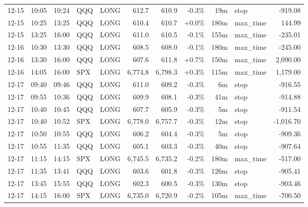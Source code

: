 \documentclass[11pt,a4paper,twoside]{article}
\begin{document}
\begin{center}
\begin{longtable}{>{\color{txtmain}}l l l l l r r r r >{\color{txtmain}}l r}
12-15 & 10:05 & 10:24 & QQQ & LONG & 612.7 & 610.9 & \textcolor{lossred}{-0.3\%} & 19m & stop & \textcolor{lossred}{-919.08} \\
12-15 & 10:25 & 13:25 & QQQ & LONG & 610.4 & 610.7 & \textcolor{wingreen}{+0.0\%} & 180m & max\_time & \textcolor{wingreen}{144.99} \\
12-15 & 13:25 & 16:00 & QQQ & LONG & 611.0 & 610.5 & \textcolor{lossred}{-0.1\%} & 155m & max\_time & \textcolor{lossred}{-235.01} \\
12-16 & 10:30 & 13:30 & QQQ & LONG & 608.5 & 608.0 & \textcolor{lossred}{-0.1\%} & 180m & max\_time & \textcolor{lossred}{-245.00} \\
12-16 & 13:30 & 16:00 & QQQ & LONG & 607.6 & 611.8 & \textcolor{wingreen}{+0.7\%} & 150m & max\_time & \textcolor{wingreen}{2,090.00} \\
12-16 & 14:05 & 16:00 & SPX & LONG & 6,774.8 & 6,798.3 & \textcolor{wingreen}{+0.3\%} & 115m & max\_time & \textcolor{wingreen}{1,179.00} \\
12-17 & 09:40 & 09:46 & QQQ & LONG & 611.0 & 609.2 & \textcolor{lossred}{-0.3\%} & 6m & stop & \textcolor{lossred}{-916.55} \\
12-17 & 09:55 & 10:36 & QQQ & LONG & 609.9 & 608.1 & \textcolor{lossred}{-0.3\%} & 41m & stop & \textcolor{lossred}{-914.88} \\
12-17 & 10:40 & 10:45 & QQQ & LONG & 607.7 & 605.9 & \textcolor{lossred}{-0.3\%} & 5m & stop & \textcolor{lossred}{-911.54} \\
12-17 & 10:40 & 10:52 & SPX & LONG & 6,778.0 & 6,757.7 & \textcolor{lossred}{-0.3\%} & 12m & stop & \textcolor{lossred}{-1,016.70} \\
12-17 & 10:50 & 10:55 & QQQ & LONG & 606.2 & 604.4 & \textcolor{lossred}{-0.3\%} & 5m & stop & \textcolor{lossred}{-909.36} \\
12-17 & 10:55 & 11:35 & QQQ & LONG & 605.1 & 603.3 & \textcolor{lossred}{-0.3\%} & 40m & stop & \textcolor{lossred}{-907.64} \\
12-17 & 11:15 & 14:15 & SPX & LONG & 6,745.5 & 6,735.2 & \textcolor{lossred}{-0.2\%} & 180m & max\_time & \textcolor{lossred}{-517.00} \\
12-17 & 11:35 & 13:41 & QQQ & LONG & 603.6 & 601.8 & \textcolor{lossred}{-0.3\%} & 126m & stop & \textcolor{lossred}{-905.41} \\
12-17 & 13:45 & 15:55 & QQQ & LONG & 602.3 & 600.5 & \textcolor{lossred}{-0.3\%} & 130m & stop & \textcolor{lossred}{-903.46} \\
12-17 & 14:15 & 16:00 & SPX & LONG & 6,735.0 & 6,720.9 & \textcolor{lossred}{-0.2\%} & 105m & max\_time & \textcolor{lossred}{-700.50} \\

\end{longtable}
\end{center}
\end{document}
